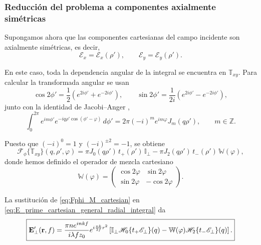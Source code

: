 \subsubsection{Reducción del problema a componentes axialmente simétricas}

Supongamos ahora que las componentes cartesianas del campo incidente son
axialmente simétricas, es decir,
\begin{equation}
  \mathscr E_x
  =
  \mathscr E_x(\rho'),
  \qquad
  \mathscr E_y
  =
  \mathscr E_y(\rho').
\label{eq:cartesian_axial_symmetry_assumption}
\end{equation}

En este caso, toda la dependencia angular de la integral se encuentra en
$\mathbb T_{xy}$. Para calcular la transformada angular se usan
\begin{equation}
  \cos2\phi'
  =
  \frac{1}{2}
  \left(
  e^{2i\phi'}
  +
  e^{-2i\phi'}
  \right),
  \qquad
  \sin2\phi'
  =
  \frac{1}{2i}
  \left(
  e^{2i\phi'}
  -
  e^{-2i\phi'}
  \right),
\end{equation}
junto con la identidad de Jacobi--Anger \cite{Watson1944},
\begin{equation}
\int_0^{2\pi}
e^{im\phi'}
e^{-iq\rho'\cos(\phi'-\varphi)}
\,d\phi'
=
2\pi(-i)^m e^{im\varphi}J_m(q\rho'),
\qquad
m\in\mathbb Z.
\label{eq:jacobi_anger_cartesian_use}
\end{equation}

Puesto que $(-i)^0=1$ y $(-i)^{\pm2}=-1$, se obtiene
\begin{equation}
\boxed{
  \mathscr F_\phi\{\mathbb T_{xy}\}
  (q,\rho',\varphi)
  =
  \pi J_0(q\rho')\,t_+(\rho')\,\mathbb I_\perp
  -
  \pi J_2(q\rho')\,t_-(\rho')\,\mathbb W(\varphi),
}
\label{eq:Fphi_M_cartesian}
\end{equation}
donde hemos definido el operador de mezcla cartesiano
\begin{equation}
\boxed{
  \mathbb W(\varphi)
  =
  \begin{pmatrix}
    \cos 2\varphi & \sin 2\varphi \\
    \sin 2\varphi & -\cos 2\varphi
  \end{pmatrix}.
}
\label{eq:def_W_mixing}
\end{equation}

La sustitución de \eqref{eq:Fphi_M_cartesian} en
\eqref{eq:E_prime_cartesian_general_radial_integral} da
\begin{equation}
\boxed{
\vb E'_\perp(\vb r,f)
=
\frac{\pi n e^{inkf}}{i\lambda f z_0}
e^{i\frac{nk}{2f}r^2}
\left[
\mathbb I_\perp
\mathscr H_0\{t_+\mathscr E_\perp\}(q)
-
\mathbb W(\varphi)
\mathscr H_2\{t_-\mathscr E_\perp\}(q)
\right].
}
\label{eq:E_field_cartesian_azimuthal}
\end{equation}

